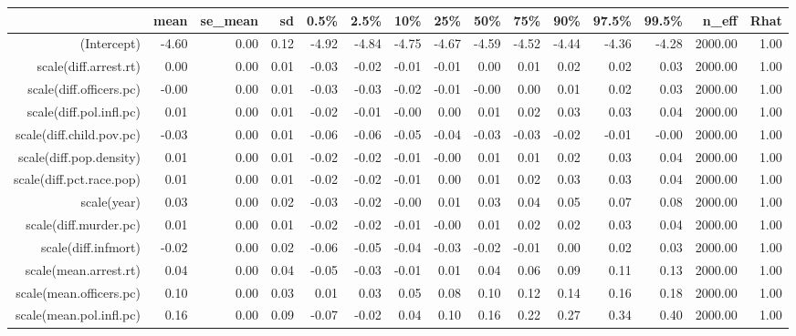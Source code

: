 \begin{table}[ht]
\centering
\begin{tabular}{rrrrrrrrrrrrrrr}
  \hline
 & mean & se\_mean & sd & 0.5\% & 2.5\% & 10\% & 25\% & 50\% & 75\% & 90\% & 97.5\% & 99.5\% & n\_eff & Rhat \\ 
  \hline
(Intercept) & -4.60 & 0.00 & 0.12 & -4.92 & -4.84 & -4.75 & -4.67 & -4.59 & -4.52 & -4.44 & -4.36 & -4.28 & 2000.00 & 1.00 \\ 
  scale(diff.arrest.rt) & 0.00 & 0.00 & 0.01 & -0.03 & -0.02 & -0.01 & -0.01 & 0.00 & 0.01 & 0.02 & 0.02 & 0.03 & 2000.00 & 1.00 \\ 
  scale(diff.officers.pc) & -0.00 & 0.00 & 0.01 & -0.03 & -0.03 & -0.02 & -0.01 & -0.00 & 0.00 & 0.01 & 0.02 & 0.03 & 2000.00 & 1.00 \\ 
  scale(diff.pol.infl.pc) & 0.01 & 0.00 & 0.01 & -0.02 & -0.01 & -0.00 & 0.00 & 0.01 & 0.02 & 0.03 & 0.03 & 0.04 & 2000.00 & 1.00 \\ 
  scale(diff.child.pov.pc) & -0.03 & 0.00 & 0.01 & -0.06 & -0.06 & -0.05 & -0.04 & -0.03 & -0.03 & -0.02 & -0.01 & -0.00 & 2000.00 & 1.00 \\ 
  scale(diff.pop.density) & 0.01 & 0.00 & 0.01 & -0.02 & -0.02 & -0.01 & -0.00 & 0.01 & 0.01 & 0.02 & 0.03 & 0.04 & 2000.00 & 1.00 \\ 
  scale(diff.pct.race.pop) & 0.01 & 0.00 & 0.01 & -0.02 & -0.02 & -0.01 & 0.00 & 0.01 & 0.02 & 0.03 & 0.03 & 0.04 & 2000.00 & 1.00 \\ 
  scale(year) & 0.03 & 0.00 & 0.02 & -0.03 & -0.02 & -0.00 & 0.01 & 0.03 & 0.04 & 0.05 & 0.07 & 0.08 & 2000.00 & 1.00 \\ 
  scale(diff.murder.pc) & 0.01 & 0.00 & 0.01 & -0.02 & -0.02 & -0.01 & -0.00 & 0.01 & 0.02 & 0.02 & 0.03 & 0.04 & 2000.00 & 1.00 \\ 
  scale(diff.infmort) & -0.02 & 0.00 & 0.02 & -0.06 & -0.05 & -0.04 & -0.03 & -0.02 & -0.01 & 0.00 & 0.02 & 0.03 & 2000.00 & 1.00 \\ 
  scale(mean.arrest.rt) & 0.04 & 0.00 & 0.04 & -0.05 & -0.03 & -0.01 & 0.01 & 0.04 & 0.06 & 0.09 & 0.11 & 0.13 & 2000.00 & 1.00 \\ 
  scale(mean.officers.pc) & 0.10 & 0.00 & 0.03 & 0.01 & 0.03 & 0.05 & 0.08 & 0.10 & 0.12 & 0.14 & 0.16 & 0.18 & 2000.00 & 1.00 \\ 
  scale(mean.pol.infl.pc) & 0.16 & 0.00 & 0.09 & -0.07 & -0.02 & 0.04 & 0.10 & 0.16 & 0.22 & 0.27 & 0.34 & 0.40 & 2000.00 & 1.00 \\ 

\end{tabular}
\end{table}
